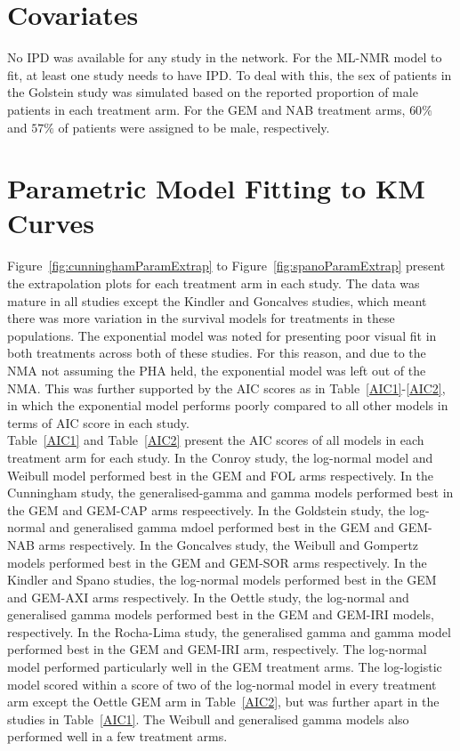 \section{Covariates}
No IPD was available for any study in the network. For the ML-NMR model to fit, at least one study needs to have IPD. To deal with this, the sex of patients in the Golstein study was simulated based on the reported proportion of male patients in each treatment arm. For the GEM and NAB treatment arms, $60\%$ and $57\%$ of patients were assigned to be male, respectively. 

\section{Parametric Model Fitting to KM Curves}
Figure~\ref{fig:cunninghamParamExtrap} to Figure~\ref{fig:spanoParamExtrap} present the extrapolation plots for each treatment arm in each study. The data was mature in all studies except the Kindler and Goncalves studies, which meant there was more variation in the survival models for treatments in these populations. The exponential model was noted for presenting poor visual fit in both treatments across both of these studies. For this reason, and due to the NMA not assuming the PHA held, the exponential model was left out of the NMA. This was further supported by the AIC scores as in Table~\ref{AIC1}-\ref{AIC2}, in which the exponential model performs poorly compared to all other models in terms of AIC score in each study.\\

Table~\ref{AIC1} and Table~\ref{AIC2} present the AIC scores of all models in each treatment arm for each study. In the Conroy study, the log-normal model and Weibull model performed best in the GEM and FOL arms respectively. In the Cunningham study, the generalised-gamma and gamma models performed best in the GEM and GEM-CAP arms respeectively. In the Goldstein study, the log-normal and generalised gamma mdoel performed best in the GEM and GEM-NAB arms respectively. In the Goncalves study, the Weibull and Gompertz models performed best in the GEM and GEM-SOR arms respectively. In the Kindler and Spano studies, the log-normal models performed best in the GEM and GEM-AXI arms respectively. In the Oettle study, the log-normal and generalised gamma models performed best in the GEM and GEM-IRI models, respectively. In the Rocha-Lima study, the generalised gamma and gamma model performed best in the GEM and GEM-IRI arm, respectively. The log-normal model performed particularly well in the GEM treatment arms. The log-logistic model scored within a score of two of the log-normal model in every treatment arm except the Oettle GEM arm in Table~\ref{AIC2}, but was further apart in the studies in Table~\ref{AIC1}. The Weibull and generalised gamma models also performed well in a few treatment arms. \\

